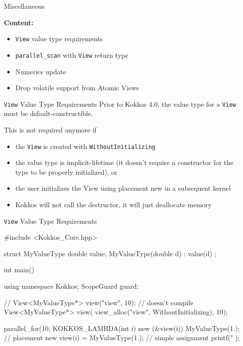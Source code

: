 
\begin{frame}[fragile]

  {\Huge Miscellaneous}

  \vspace{10pt}

  \textbf{Content:}
  \begin{itemize}
    \item {\texttt{View} value type requirements}
    \item {\texttt{parallel\_scan} with \texttt{View} return type}
    \item {Numerics update}
    \item {Drop volatile support from Atomic Views}
  \end{itemize}

\end{frame}


\begin{frame}[fragile]{\texttt{View} Value Type Requirements}
Prior to Kokkos 4.0, the value type for a \texttt{View} must be default-constructible.

This is not required anymore if
\begin{itemize}
  \item {the \texttt{View} is created with \texttt{WithoutInitializing}}
  \item {the value type is implicit-lifetime (it doesn't require a constructor for the type to be properly initialized), or}
  \item {the user initializes the View using placement new in a subsequent kernel}
  \item {Kokkos will not call the destructor, it will just deallocate memory}
\end{itemize}
\end{frame}

\begin{frame}[fragile]{\texttt{View} Value Type Requirements}
\begin{code}
#include <Kokkos_Core.hpp>

struct MyValueType
{
  double value;
  MyValueType(double d) : value(d) {}
};

int main() {
  using namespace Kokkos;
  ScopeGuard guard;

  // View<MyValueType*> view("view", 10); // doesn't compile
  View<MyValueType*> view(
    view_alloc("view", WithoutInitializing), 10);

  parallel_for(10, KOKKOS_LAMBDA(int i) {
    new (&view(i)) MyValueType(1.); // placement new
    view(i) = MyValueType(1.); // simple assignment
    printf("%
  });
}
\end{code}
\end{frame}

